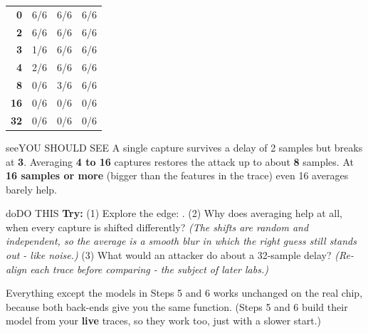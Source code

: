 \documentclass[11pt,letterpaper]{article}
\begin{document}


{\small{}
\begin{longtable}{|R{0.4058}|R{0.1981}|R{0.1981}|R{0.1981}|}
\hline
{} &  &  &  \\ \hline
\endhead
\textbf{0} & 6/6 & 6/6 & 6/6 \\ \hline
\textbf{2} & 6/6 & 6/6 & 6/6 \\ \hline
\textbf{3} & 1/6 & 6/6 & 6/6 \\ \hline
\textbf{4} & 2/6 & 6/6 & 6/6 \\ \hline
\textbf{8} & 0/6 & 3/6 & 6/6 \\ \hline
\textbf{16} & 0/6 & 0/6 & 0/6 \\ \hline
\textbf{32} & 0/6 & 0/6 & 0/6 \\ \hline
\end{longtable}}

\vspace{4pt}

\begin{guidecallout}{see}{YOU SHOULD SEE}
A single capture survives a delay of 2 samples but breaks at \textbf{3}. Averaging \textbf{4 to 16} captures restores
the attack up to about \textbf{8} samples. At \textbf{16 samples or more} (bigger than the features in the trace) even
16 averages barely help.
\end{guidecallout}

\begin{guidecallout}{do}{DO THIS}
\textbf{Try:} (1) Explore the edge: . (2) Why does averaging help at
all, when every capture is shifted differently? \emph{(The shifts are random and independent, so the average is a
smooth blur in which the right guess still stands out - like noise.)} (3) What would an attacker do about a 32-sample
delay? \emph{(Re-align each trace before comparing - the subject of later labs.)}
\end{guidecallout}

\Needspace{324pt}


Everything except the models in Steps 5 and 6 works unchanged on the real chip, because both back-ends give you the
same  function. (Steps 5 and 6 build their model from your \textbf{live} traces, so they work
too, just with a slower start.)
\end{document}
